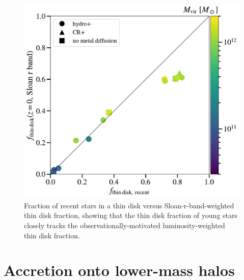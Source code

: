 \documentclass[fleqn,usenatbib]{mnras}
\begin{document}
\begin{figure}
    \centering
    \includegraphics[width=\columnwidth]{figures/prevalence/thin_disk_v_thin_disk.pdf}
    \caption{
    Fraction of recent stars in a thin disk versus Sloan-r-band-weighted thin disk fraction, showing that the thin disk fraction of young stars closely tracks the observationally-motivated luminosity-weighted thin disk fraction.
    }
    \label{f: thin disk v thin disk}
\end{figure}

\section{Accretion onto lower-mass halos}
\label{s: appendix-other sims}
\end{document}

